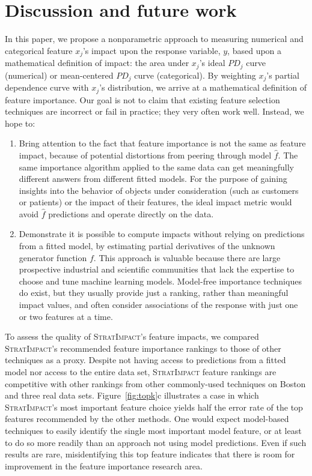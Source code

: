 \documentclass[smallextended]{svjour3}       %
\newcommand{\figref}[1]{Figure~\ref{#1}}
\newcommand{\simp}{\fontfamily{cmr}\textsc{\small StratImpact}}
\begin{document}
\section{Discussion and future work}\label{sec:discussion}

In this paper, we propose a nonparametric approach to measuring numerical and categorical feature $x_j$'s impact upon the response variable, $y$, based upon a mathematical definition of impact: the area under $x_j$'s ideal $PD_j$ curve (numerical) or mean-centered $PD_j$ curve (categorical). By weighting $x_j$'s  partial dependence curve with $x_j$'s distribution, we arrive at a mathematical definition of feature importance.  Our goal is not to claim that existing feature selection techniques are incorrect or fail in practice; they very often work well. Instead, we hope to:

\begin{enumerate}
\item Bring attention to the fact that feature importance is not the same as feature impact, because of potential distortions from peering through model $\hat{f}$. The same importance algorithm applied to the same data can get meaningfully different answers from different fitted models.   For the purpose of gaining insights into the behavior of objects under consideration (such as customers or patients) or the impact of their features, the ideal impact metric would avoid $\hat{f}$ predictions and operate directly on the data.\vspace{2mm}

\item Demonstrate it is possible to compute impacts without relying on predictions from a fitted model, by estimating partial derivatives of the unknown generator function $f$. This approach is valuable because there are large prospective industrial and scientific communities that lack the expertise to choose and tune machine learning models. Model-free importance techniques do exist, but they usually provide just a ranking, rather than meaningful impact values, and often consider associations of the response with just one or two features at a time.
\end{enumerate}
 
To assess the quality of \simp's feature impacts, we compared \simp's recommended feature importance rankings to those of other techniques as a proxy. Despite not having access to predictions from a fitted model nor access to the entire data set, \simp{} feature rankings are competitive with other rankings from other commonly-used techniques on Boston and three real data sets.  \figref{fig:topk}c illustrates a case in which \simp's most important feature choice yields half the error rate of the top features recommended by the other methods.  One would expect model-based techniques to easily identify the single most important model feature, or at least to do so more readily than an approach not using model predictions.  Even if such results are rare, misidentifying this top feature indicates that there is room for improvement in the feature importance research area. 
\end{document}
